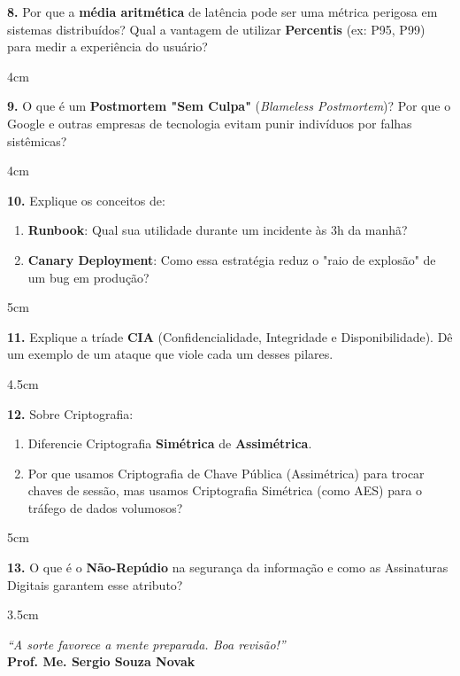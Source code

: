\documentclass[12pt]{article}
\begin{document}
\textbf{8.} Por que a \textbf{média aritmética} de latência pode ser uma métrica perigosa em sistemas distribuídos? Qual a vantagem de utilizar \textbf{Percentis} (ex: P95, P99) para medir a experiência do usuário?
\begin{resposta}{4cm}
\end{resposta}




\textbf{9.} O que é um \textbf{Postmortem "Sem Culpa"} (\textit{Blameless Postmortem})? Por que o Google e outras empresas de tecnologia evitam punir indivíduos por falhas sistêmicas?
\begin{resposta}{4cm}
\end{resposta}

\textbf{10.} Explique os conceitos de:
\begin{enumerate}[label=\alph*)]
    \item \textbf{Runbook}: Qual sua utilidade durante um incidente às 3h da manhã?
    \item \textbf{Canary Deployment}: Como essa estratégia reduz o "raio de explosão" de um bug em produção?
\end{enumerate}
\begin{resposta}{5cm}
\end{resposta}




\textbf{11.} Explique a tríade \textbf{CIA} (Confidencialidade, Integridade e Disponibilidade). Dê um exemplo de um ataque que viole cada um desses pilares.
\begin{resposta}{4.5cm}
\end{resposta}

\textbf{12.} Sobre Criptografia:
\begin{enumerate}[label=\alph*)]
    \item Diferencie Criptografia \textbf{Simétrica} de \textbf{Assimétrica}.
    \item Por que usamos Criptografia de Chave Pública (Assimétrica) para trocar chaves de sessão, mas usamos Criptografia Simétrica (como AES) para o tráfego de dados volumosos?
\end{enumerate}
\begin{resposta}{5cm}
\end{resposta}

\textbf{13.} O que é o \textbf{Não-Repúdio} na segurança da informação e como as Assinaturas Digitais garantem esse atributo?
\begin{resposta}{3.5cm}
\end{resposta}

\vspace{1cm}
\begin{center}
    \textit{“A sorte favorece a mente preparada. Boa revisão!”} \\
    \textbf{Prof. Me. Sergio Souza Novak}
\end{center}
\end{document}
